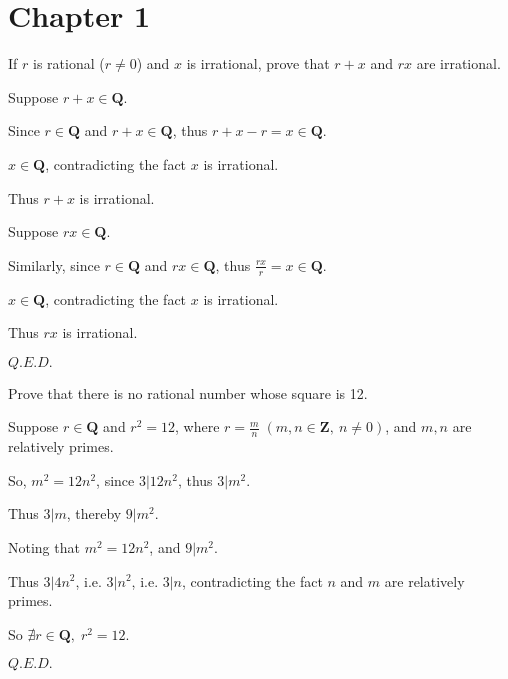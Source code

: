 \section{ Chapter 1 }

\bigskip\bigskip\bigskip

\begin{question}{}{}
If $r$ is rational ($r\neq0$) and $x$ is irrational,
prove that $r+x$ and $rx$ are irrational.
\end{question}
\begin{Proof}
Suppose $r+x\in\mathbf{Q}$.

Since $r\in\mathbf{Q}$  and $r+x\in\mathbf{Q}$, 
thus $r+x-r=x\in\mathbf{Q}$.

$x\in\mathbf{Q}$,
contradicting the fact $x$ is irrational.

Thus $r+x$ is irrational.\bigskip

Suppose $rx\in\mathbf{Q}$.

Similarly, since $r\in\mathbf{Q}$ and $rx\in\mathbf{Q}$,
thus $\frac{rx}{r}=x\in\mathbf{Q}$.

$x\in\mathbf{Q}$,
contradicting the fact $x$ is irrational.

Thus $rx$ is irrational.

\hfill$Q.E.D.$\qedhere\hspace{42pt}
\end{Proof}
\begin{question}{}{}
Prove that there is no rational number whose square is 12.
\end{question}
\begin{Proof}
Suppose $r\in\mathbf{Q}$ and $r^2=12$,
where $r=\frac{m}{n}\; (m,n\in\mathbf{Z},\:n\neq0)$, 
and $m,n$ are relatively primes.

So, $m^2=12n^2$,
since $3|12n^2$, thus $3|m^2$.

Thus $3|m$, thereby $9|m^2$.

Noting that $m^2=12n^2$, and $9|m^2$.

Thus $3|4n^2$, i.e. $3|n^2$, i.e. $3|n$,
contradicting the fact $n$ and $m$ are relatively primes.

So $\nexists r\in\mathbf{Q},\;r^2=12$.

\hfill$Q.E.D.$\qedhere\hspace{42pt}

\end{Proof}

\newpage